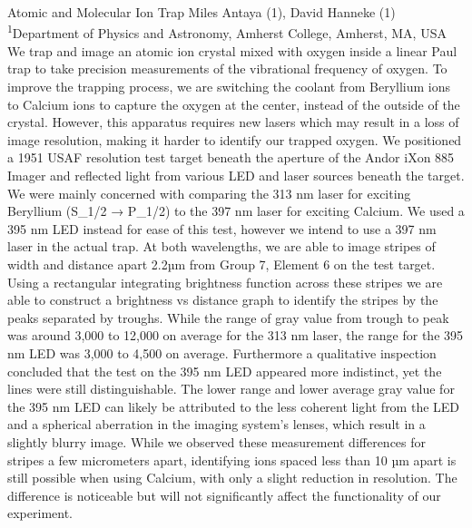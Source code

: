 \makeabstract
{
Atomic and Molecular Ion Trap
}
{
Miles Antaya (1), David Hanneke (1)
}
{
\textsuperscript{1}Department of Physics and Astronomy, Amherst College, Amherst, MA, USA
}
{
We trap and image an atomic ion crystal mixed with oxygen inside a linear Paul trap to take precision measurements of the vibrational frequency of oxygen. To improve the trapping process, we are switching the coolant from Beryllium ions to Calcium ions to capture the oxygen at the center, instead of the outside of the crystal. However, this apparatus requires new lasers which may result in a loss of image resolution, making it harder to identify our trapped oxygen.
}
{
We positioned a 1951 USAF resolution test target beneath the aperture of the Andor iXon 885 Imager and reflected light from various LED and laser sources beneath the target. We were mainly concerned with comparing the 313 nm laser for exciting Beryllium (S\_1/2 → P\_1/2) to the 397 nm laser for exciting Calcium. We used a 395 nm LED instead for ease of this test, however we intend to use a 397 nm laser in the actual trap.
}
{
At both wavelengths, we are able to image stripes of width and distance apart 2.2µm from Group 7, Element 6 on the test target. Using a rectangular integrating brightness function across these stripes we are able to construct a brightness vs distance graph to identify the stripes by the peaks separated by troughs. While the range of gray value from trough to peak was around 3,000 to 12,000 on average for the 313 nm laser, the range for the 395 nm LED was 3,000 to 4,500 on average. Furthermore a qualitative inspection concluded that the test on the 395 nm LED appeared more indistinct, yet the lines were still distinguishable.
}
{
The lower range and lower average gray value for the 395 nm LED can likely be attributed to the less coherent light from the LED and a spherical aberration in the imaging system’s lenses, which result in a slightly blurry image. While we observed these measurement differences for stripes a few micrometers apart, identifying ions spaced less than 10 µm apart is still possible when using Calcium, with only a slight reduction in resolution. The difference is noticeable but will not significantly affect the functionality of our experiment.
}

\newpage
